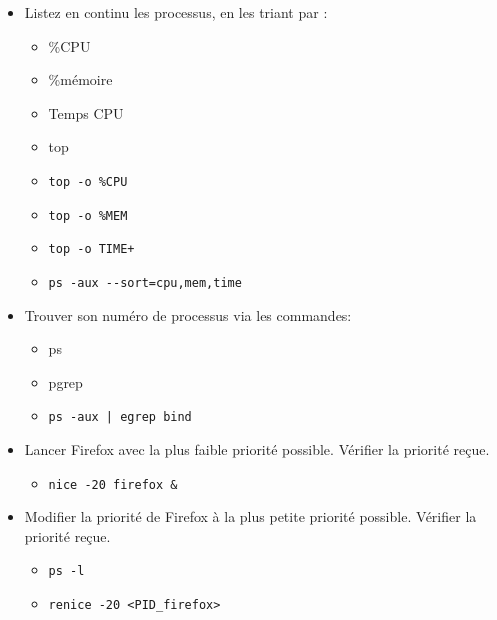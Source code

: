 \documentclass[a4paper]{article}
\begin{document}
\begin{itemize}
\item Listez en continu les processus, en les triant par :
\begin{itemize}
    \item \%CPU
    \item \%mémoire
    \item Temps CPU
    \item top
\end{itemize}
\begin{example}
    \begin{itemize}
        \item \texttt{top -o \%CPU}
        \item \texttt{top -o \%MEM}
        \item \texttt{top -o TIME+}
        \item \texttt{ps -aux -{}-sort=cpu,mem,time}
    \end{itemize}
\end{example}

\item Trouver son numéro de processus via les commandes:
\begin{itemize}
    \item ps
    \item pgrep
\end{itemize}
\begin{example}
    \begin{itemize}
        \item \texttt{ps -aux | egrep bind}
    \end{itemize}
\end{example}

\item Lancer Firefox avec la plus faible priorité possible. Vérifier la priorité reçue.
\begin{example}
    \begin{itemize}
        \item \texttt{nice -20 firefox \&}
    \end{itemize}
\end{example}

\item Modifier la priorité de Firefox à la plus petite priorité possible. Vérifier la priorité reçue.
\begin{example}
    \begin{itemize}
        \item \texttt{ps -l}
        \item \texttt{renice -20 <PID\_firefox>}
    \end{itemize}
\end{example}


\end{itemize}
\end{document}
